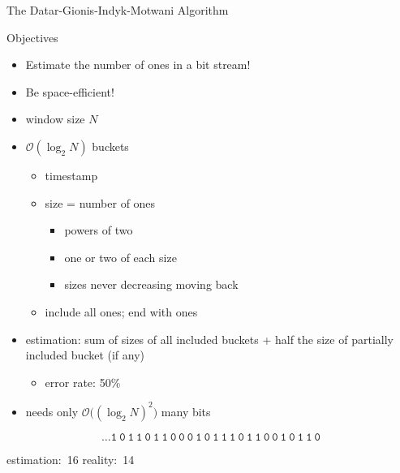 \begin{frame}[t]{The Datar-Gionis-Indyk-Motwani Algorithm}
	\begin{block}{Objectives}
		\begin{itemize}
			\item
			Estimate the number of ones in a bit stream!

			\item
			Be space-efficient!
		\end{itemize}
	\end{block}
	\begin{itemize}
		\item
		window size $N$

		\item
		$\mathcal{O}(\log_2 N)$ buckets
		\begin{itemize}
			\item
			timestamp

			\item
			size = number of ones
			\begin{itemize}
				\item
				powers of two

				\item
				one or two of each size

				\item
				sizes never decreasing moving back
			\end{itemize}

			\item
			include all ones; end with ones
		\end{itemize}
	
		\item
		estimation: sum of sizes of all included buckets + half the size of partially included bucket (if any)
		\begin{itemize}
			\item
			error rate: 50\%
		\end{itemize}

		\item
		needs only $\mathcal{O}\big( \!(\log_2 N)^2 \big)$ many bits
	\end{itemize}
	\vspace{1mm}
	{
		\Large
		\begin{equation*}
			\mathtt{\boxed{\dots 1 ~ 0 ~ 1} ~ \boxed{1 ~ 0 ~ 1 ~ 1 ~ 0 ~ 0 ~ 0 ~ 1} ~ 0 ~ \boxed{1 ~ 1 ~ 1 ~ 0 ~ 1} ~ \boxed{1 ~ 0 ~ 0 ~ 1} ~ 0 ~ \boxed{1} ~ \boxed{1} ~ 0}
		\end{equation*}
	}
	\begin{center}
		\small
		estimation:~16 \qquad\qquad reality:~14
	\end{center}
\end{frame}